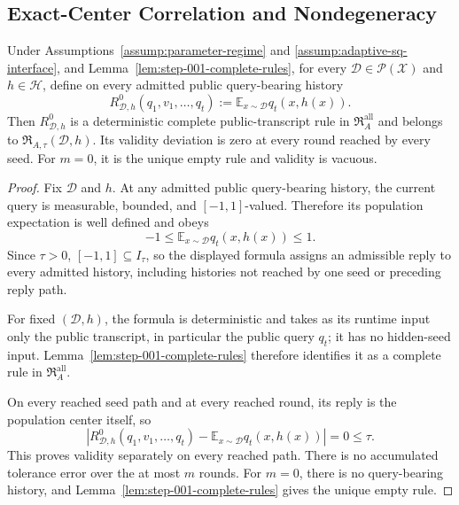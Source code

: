 \subsection{Exact-Center Correlation and Nondegeneracy}
\label{app:step-003}

\begin{lemma}
\label{lem:step-003-exact-center-legality}
Under Assumptions~\ref{assump:parameter-regime} and
\ref{assump:adaptive-sq-interface}, and
Lemma~\ref{lem:step-001-complete-rules}, for every
\(\mathcal D\in\mathcal P(\mathcal X)\) and \(h\in\mathcal H\), define on
every admitted public query-bearing history
\[
R^0_{\mathcal D,h}(q_1,v_1,\ldots,q_t)
:=\mathbb E_{x\sim\mathcal D}q_t(x,h(x)).
\]
Then \(R^0_{\mathcal D,h}\) is a deterministic complete public-transcript
rule in \(\mathfrak R_A^{\mathrm{all}}\) and belongs to
\(\mathfrak R_{A,\tau}(\mathcal D,h)\).  Its validity deviation is zero at
every round reached by every seed.  For \(m=0\), it is the unique empty rule
and validity is vacuous.
\end{lemma}

\begin{proof}
Fix \(\mathcal D\) and \(h\).  At any admitted public query-bearing history,
the current query is measurable, bounded, and \([-1,1]\)-valued.  Therefore
its population expectation is well defined and obeys
\[
-1\le\mathbb E_{x\sim\mathcal D}q_t(x,h(x))\le1.
\]
Since \(\tau>0\), \([-1,1]\subseteq I_\tau\), so the displayed formula
assigns an admissible reply to every admitted history, including histories
not reached by one seed or preceding reply path.

For fixed \((\mathcal D,h)\), the formula is deterministic and takes as its
runtime input only the public transcript, in particular the public query
\(q_t\); it has no hidden-seed input.  Lemma~\ref{lem:step-001-complete-rules}
therefore identifies it as a complete rule in
\(\mathfrak R_A^{\mathrm{all}}\).

On every reached seed path and at every reached round, its reply is the
population center itself, so
\[
\left|R^0_{\mathcal D,h}(q_1,v_1,\ldots,q_t)
-\mathbb E_{x\sim\mathcal D}q_t(x,h(x))\right|=0\le\tau.
\]
This proves validity separately on every reached path.  There is no
accumulated tolerance error over the at most \(m\) rounds.  For \(m=0\),
there is no query-bearing history, and
Lemma~\ref{lem:step-001-complete-rules} gives the unique empty rule.
\end{proof}


